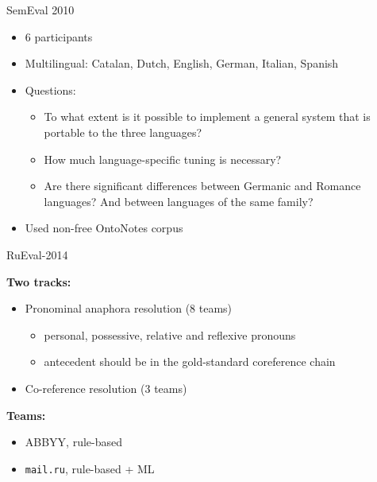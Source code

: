 \documentclass[dvipsnames, 10pt, compress]{beamer}
\begin{document}
\begin{frame}{SemEval 2010}


\begin{itemize}
  \item 6 participants
  \item Multilingual: Catalan, Dutch, English, German, Italian, Spanish
  \item Questions:
  \begin{itemize}
\item    To what extent is it possible to implement a general system that is portable to the three languages?
\item    How much language-specific tuning is necessary?
\item    Are there significant differences between Germanic and Romance languages? And between languages of the same family?
\end{itemize}
  \item Used non-free OntoNotes corpus
\end{itemize}



\end{frame}

\begin{frame}{RuEval-2014}

\textbf{Two tracks:}
\begin{itemize}
  \item Pronominal anaphora resolution (8 teams)
  \begin{itemize}
     \item personal, possessive, relative and reflexive pronouns
     \item antecedent should be in the gold-standard coreference chain
  \end{itemize}
  \item Co-reference resolution (3 teams)
\end{itemize}

\textbf{Teams:}
\begin{itemize}
  \item ABBYY, rule-based
  \item \texttt{mail.ru}, rule-based + ML
\end{itemize}



\end{frame}
\end{document}
